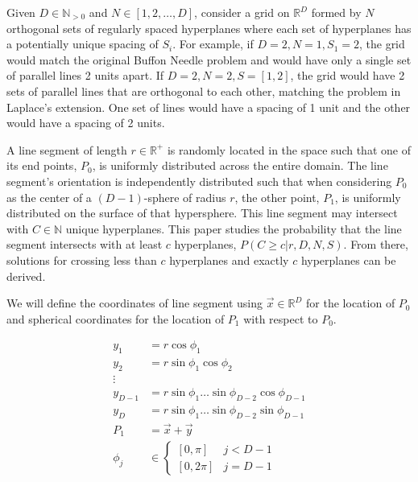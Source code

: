 \documentclass{article}
\begin{document}
Given $D\in\mathbb{N}_{>0}$ and $N\in[1,2,\dots,D]$, consider a grid on $\mathbb{R}^D$ formed by $N$ orthogonal sets of regularly spaced hyperplanes where each set of hyperplanes
has a potentially unique spacing of $S_i$. For example, if $D=2, N=1, S_1=2$, the grid would match the original Buffon Needle problem and would have only a single set of parallel lines 2 units apart.
If $D=2, N=2, S=[1, 2]$, the grid would have 2 sets of parallel lines that are orthogonal to each other, matching the problem in Laplace's extension. One set of lines would have a spacing of 1 unit and 
the other would have a spacing of 2 units.
\begin{tikzpicture}
	
\end{tikzpicture}

A line segment of length $r\in\mathbb{R}^+$ is randomly located in the space such that one of its end points, $P_0$, is uniformly distributed
across the entire domain. The line segment's orientation is independently distributed such that when considering $P_0$ as the center of a $(D-1)$-sphere of radius $r$, the other point, $P_1$,
is uniformly distributed on the surface of that hypersphere. This line segment may intersect with $C\in\mathbb{N}$ unique hyperplanes. This paper studies the probability that the line segment
intersects with at least $c$ hyperplanes, $P(C\ge c|r, D, N, S)$. From there, solutions for crossing less than $c$ hyperplanes and exactly $c$ hyperplanes can
be derived.

We will define the coordinates of line segment using $\vec{x}\in\mathbb{R}^D$ for the location of $P_0$ and spherical coordinates for the location of $P_1$ with respect to $P_0$.

\begin{align*}
    y_1 &= r\cos{\phi_1}\\
    y_2 &= r\sin{\phi_1}\cos{\phi_2}\\
    \vdots\\
    y_{D-1} &= r\sin{\phi_1}\hdots\sin{\phi_{D-2}}\cos{\phi_{D-1}}\\
    y_{D} &= r\sin{\phi_1}\hdots\sin{\phi_{D-2}}\sin{\phi_{D-1}}\\
    P_1 &= \vec{x} + \vec{y}\\
	\phi_j &\in \begin{cases}[0, \pi] & j<D-1 \\ [0, 2\pi] & j=D-1\end{cases}
\end{align*}
\end{document}
